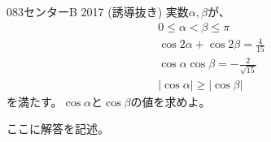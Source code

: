 \begin{prob}{083}{}{センターB 2017 (誘導抜き)}
 実数$\alpha, \beta$が、
 \begin{align*}
  0\le \alpha < \beta \le \pi \\
  \cos 2\alpha + \cos 2\beta = \frac{4}{15} \\
  \cos\alpha \cos\beta = -\frac{2}{\sqrt{15}} \\
  \left|\cos\alpha\right| \ge  \left|\cos\beta\right|
 \end{align*}
 を満たす。$\cos\alpha$と$\cos\beta$の値を求めよ。
\end{prob}
ここに解答を記述。